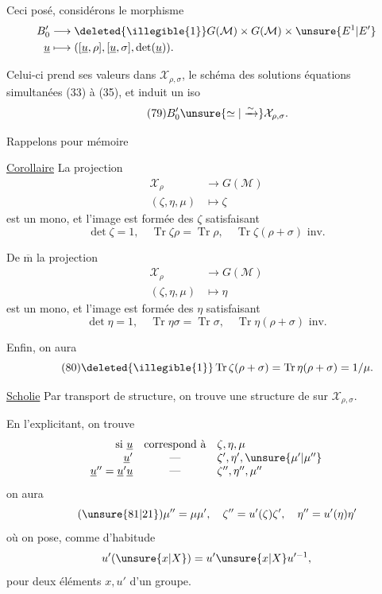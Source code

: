 Ceci posé, considérons le morphisme
\[
\begin{aligned}
B'_0&\longrightarrow\deleted{\illegible{1}}G(\mathcal M)\times G(\mathcal M)\times\unsure{E^1|E'}\\
\underline u&\longmapsto([\underline u,\rho],[\underline u,\sigma],\det(\underline u)).
\end{aligned}
\]


Celui-ci prend ses valeurs dans $\mathcal X_{\rho,\sigma}$, le schéma des solutions  équations simultanées (33) à (35), et induit un iso
\[
\tag{79}B'_0\unsure{\simeq|\xrightarrow{\sim}}\mathcal X_{\rho,\sigma}.
\]

 Rappelons  pour mémoire

\uline{Corollaire} La projection
\[
\begin{aligned}
\mathcal X_\rho&\longrightarrow G(\mathcal M)\\
(\zeta,\eta,\mu)&\longmapsto\zeta
\end{aligned}
\]
est un mono, et l'image est formée des $\zeta$ satisfaisant
\[
\det\zeta=1,\quad \operatorname{Tr}\zeta\rho=\operatorname{Tr}\rho,\quad \operatorname{Tr}\zeta(\rho+\sigma)\text{ inv.}
\]

De $\overline{\mathrm m}$ la projection
\[
\begin{aligned}
\mathcal X_\rho&\longrightarrow G(\mathcal M)\\
(\zeta,\eta,\mu)&\longmapsto\eta
\end{aligned}
\]
est un mono, et l'image est formée des $\eta$ satisfaisant
\[
\det\eta=1,\quad\operatorname{Tr}\eta\sigma=\operatorname{Tr}\sigma,\quad\operatorname{Tr}\eta(\rho+\sigma)\text{ inv.}
\]

Enfin, on aura
\[
\tag{80}\deleted{\illegible{1}}\operatorname{Tr}\zeta(\rho+\sigma)=\operatorname{Tr}\eta(\rho+\sigma)=1/\mu.
\]

\uline{Scholie} Par transport de structure, on trouve une structure de  sur $\mathcal X_{\rho,\sigma}$.


En l'explicitant, on trouve
\[
\begin{array}{rcl}
\text{si }\underline u&\text{correspond à}&\zeta,\eta,\mu\\
\underline u'&\text{---}&\zeta',\eta',\unsure{\mu'|\mu''}\\
\underline u''=\underline u'\underline u&\text{---}&\zeta'',\eta'',\mu''
\end{array}
\]
on aura
\[
\tag{\unsure{81|21}}\mu''=\mu\mu',\quad\zeta''=u'(\zeta)\zeta',\quad\eta''=u'(\eta)\eta'
\]
où on pose, comme d'habitude
\[
u'(\unsure{x|X})=u'\unsure{x|X}u'^{-1},
\]
pour deux éléments $x,u'$ d'un groupe.

